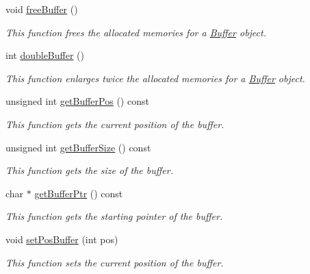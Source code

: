 \begin{CompactItemize}
void \hyperlink{classkmaOrange_1_1Buffer_731c624eb9b6e4536226925a4c1ab067}{freeBuffer} ()
\begin{CompactList}\small\item\em This function frees the allocated memories for a \hyperlink{classkmaOrange_1_1Buffer}{Buffer} object. \item\end{CompactList}\item 
int \hyperlink{classkmaOrange_1_1Buffer_4d13cf9b192211134c9a2e92d4eec326}{doubleBuffer} ()
\begin{CompactList}\small\item\em This function enlarges twice the allocated memories for a \hyperlink{classkmaOrange_1_1Buffer}{Buffer} object. \item\end{CompactList}\item 
unsigned int \hyperlink{classkmaOrange_1_1Buffer_506499720e4e8cfdd18ac973d9ea9e71}{getBufferPos} () const 
\begin{CompactList}\small\item\em This function gets the current position of the buffer. \item\end{CompactList}\item 
unsigned int \hyperlink{classkmaOrange_1_1Buffer_2e3c1afe4c305888ec50458256a9e2d6}{getBufferSize} () const 
\begin{CompactList}\small\item\em This function gets the size of the buffer. \item\end{CompactList}\item 
char $\ast$ \hyperlink{classkmaOrange_1_1Buffer_05b1cadf0bc0a1ec4c5bb03fc02654bf}{getBufferPtr} () const 
\begin{CompactList}\small\item\em This function gets the starting pointer of the buffer. \item\end{CompactList}\item 
void \hyperlink{classkmaOrange_1_1Buffer_22aa8b5ca6b4a4135762883479bc7d16}{setPosBuffer} (int pos)
\begin{CompactList}\small\item\em This function sets the current position of the buffer. \item\end{CompactList}\item 

\end{CompactItemize}
